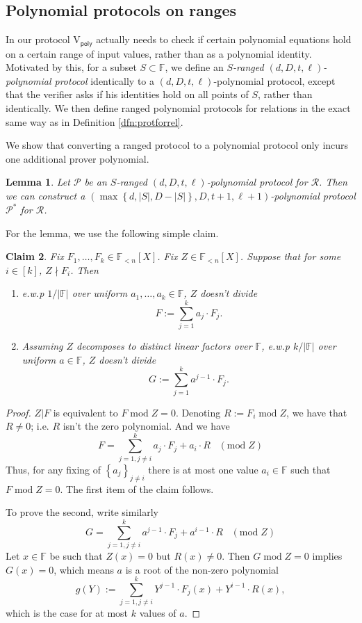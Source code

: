 \documentclass[11pt]{article} %
\newcommand{\F}{\ensuremath{\mathbb F}\xspace}
\newcommand{\negl}{\ensuremath{\mathsf{negl}(\lambda)}\xspace}
\newcommand{\polprot}[4]{$(#1,#2,#3,#4)$-polynomial protocol}
\newcommand{\rangedprot}[5]{$#5$-ranged $(#1,#2,#3,#4)$-polynomial protocol}
\newcommand{\acc}{\ensuremath{\mathsf{acc}}\xspace}
\newcommand{\defeq}{:=}
\newcommand{\sett}[2]{\ensuremath{\set{#1}_{#2}}\xspace}
\renewcommand{\mod}{\ensuremath{\;\mathrm{mod}\;}}
\newcommand{\prvpoly}{\ensuremath{\mathrm{P_{\mathsf{poly}}}}\xspace}
\newcommand{\verpoly}{\ensuremath{\mathrm{V_{\mathsf{poly}}}}\xspace}
\newcommand{\rel}{\ensuremath{\mathcal{R}}\xspace}
\newcommand{\set}[1]{\ensuremath{\left\{#1\right\}}\xspace}
\newcommand{\polysofdeg}[1]{\ensuremath{\F_{< #1}[X]}\xspace}
\newcommand{\prot}{\ensuremath{\mathscr{P}}\xspace}
\newcommand{\protprime}{\ensuremath{\mathscr{P^*}}\xspace}
\newtheorem{lemma}{Lemma}[section]
\newtheorem{claim}[lemma]{Claim}
\begin{document}
\subsection{Polynomial protocols on ranges}
In our protocol \verpoly actually needs to check if certain polynomial equations hold on a certain range of input values, rather than as a polynomial identity.
Motivated by this, for a subset $S\subset \F$, we define an \emph{$S$-ranged $(d,D,t,\ell)$-polynomial protocol} identically to a $(d,D,t,\ell)$-polynomial protocol, except that the verifier asks if his identities hold on all points of $S$, rather than identically. We then define ranged polynomial protocols for relations in the exact same way as in Definition \ref{dfn:protforrel}.

We show that converting a ranged protocol to a polynomial protocol only incurs one additional prover polynomial.
\begin{lemma}\label{lem:ranged-to-reg}
 Let \prot be an \rangedprot{d}{D}{t}{\ell}{S} for \rel. Then we can construct a \polprot{\max \set{d,|S|,D-|S|}}{D}{t+1}{\ell+1} \protprime for \rel.
 
% 
%  
\end{lemma}

For the lemma, we use the following simple claim.
\begin{claim}\label{clm:divcheck}
 Fix $F_1,\ldots,F_k \in \polysofdeg{n}$. Fix $Z\in \polysofdeg{n}$. 
 Suppose that for some $i\in [k]$, $Z\nmid F_i$.
 Then
 \begin{enumerate}
  \item 
 e.w.p $1/|\F|$ over uniform $a_1,\ldots,a_k \in \F$, $Z$ doesn't divide
 \[F\defeq \sum_{j=1}^k a_j \cdot F_j.\]
 \item Assuming $Z$ decomposes to distinct linear factors over \F, e.w.p $k/|\F|$ over uniform $a\in \F$, $Z$ doesn't divide
 \[G\defeq \sum_{j=1}^k a^{j-1} \cdot F_j.\]
  \end{enumerate}
\end{claim}
\begin{proof}
 $Z| F$ is equivalent to $F\mod Z =0$.
 Denoting $R\defeq F_i\mod Z$, we have that $R\neq 0$;
 i.e. $R$ isn't the zero polynomial.
 And we have 
 \[F= \sum_{j=1, j\neq i}^k a_j \cdot F_j + a_i\cdot R\;\;\;  (\mathrm{mod}\; Z)\]
 Thus, for any fixing of  \sett{a_j}{j\neq i} there is at most one value $a_i\in \F$ 
 such that $F\mod Z =0$.
 The first item of the claim follows.
 
 To prove the second, write similarly
 \[G= \sum_{j=1, j\neq i}^k a^{j-1} \cdot F_j + a^{i-1}\cdot R\;\;\;  (\mathrm{mod}\; Z)\]
 Let $x\in \F$ be such that $Z(x)=0$ but $R(x)\neq 0$.
 Then $G\mod Z =0$ implies $G(x)=0$, which means $a$ is a root of the non-zero polynomial
 \[g(Y)\defeq \sum_{j=1, j\neq i}^k Y^{j-1} \cdot F_j(x) + Y^{i-1}\cdot R(x),\]
 which is the case for at most $k$ values of $a$.
\end{proof}
\end{document}
